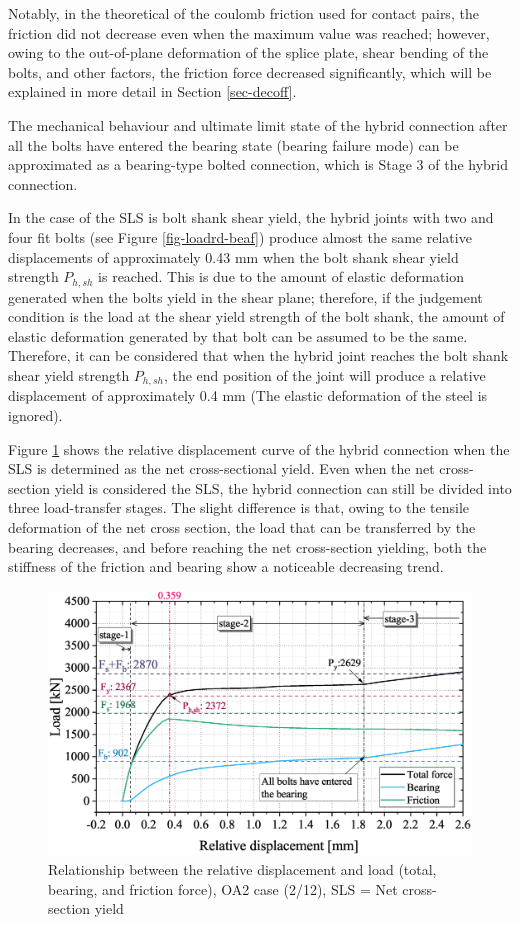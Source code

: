 Notably, in the theoretical of the coulomb friction used for contact pairs, the friction did not decrease even when the maximum value was reached; however, owing to the out-of-plane deformation of the splice plate, shear bending of the bolts, and other factors, the friction force decreased significantly, which will be explained in more detail in Section \ref{sec-decoff}.

The mechanical behaviour and ultimate limit state of the hybrid connection after all the bolts have entered the bearing state (bearing failure mode) can be approximated as a bearing-type bolted connection, which is Stage 3 of the hybrid connection.

In the case of the SLS is bolt shank shear yield, the hybrid joints with two and four fit bolts (see Figure \ref{fig-loadrd-beaf}) produce almost the same relative displacements of approximately 0.43 mm when the bolt shank shear yield strength $P_{h,sh}$ is reached. This is due to the amount of elastic deformation generated when the bolts yield in the shear plane; therefore, if the judgement condition is the load at the shear yield strength of the bolt shank, the amount of elastic deformation generated by that bolt can be assumed to be the same. Therefore, it can be considered that when the hybrid joint reaches the bolt shank shear yield strength $P_{h,sh}$, the end position of the joint will produce a relative displacement of approximately 0.4 mm (The elastic deformation of the steel is ignored).


Figure \ref{fig-lrd-ncy} shows the relative displacement curve of the hybrid connection when the SLS is determined as the net cross-sectional yield. Even when the net cross-section yield is considered the SLS, the hybrid connection can still be divided into three load-transfer stages. The slight difference is that, owing to the tensile deformation of the net cross section, the load that can be transferred by the bearing decreases, and before reaching the net cross-section yielding, both the stiffness of the friction and bearing show a noticeable decreasing trend.



\begin{figure}
    \centering
    \includegraphics[width=0.85\linewidth]{imgs/ch7/LD-OAP2.eps}
    \caption{Relationship between the relative displacement and load (total, bearing, and friction force), OA2 case (2/12), SLS = Net cross-section yield}
    \label{fig-lrd-ncy}
\end{figure}


